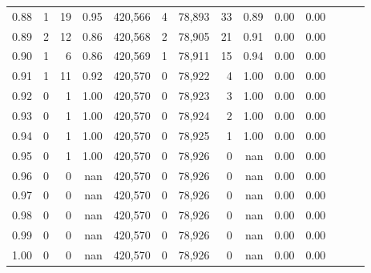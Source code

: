 \begin{tabular}{rrrrrrrrrrrrrr}
0.88 &       1 &     19 &  0.95 &  420,566 &        4 &  78,893 &      33 &  0.89 &  0.00 &      0.00 \\
0.89 &       2 &     12 &  0.86 &  420,568 &        2 &  78,905 &      21 &  0.91 &  0.00 &      0.00 \\
0.90 &       1 &      6 &  0.86 &  420,569 &        1 &  78,911 &      15 &  0.94 &  0.00 &      0.00 \\
0.91 &       1 &     11 &  0.92 &  420,570 &        0 &  78,922 &       4 &  1.00 &  0.00 &      0.00 \\
0.92 &       0 &      1 &  1.00 &  420,570 &        0 &  78,923 &       3 &  1.00 &  0.00 &      0.00 \\
0.93 &       0 &      1 &  1.00 &  420,570 &        0 &  78,924 &       2 &  1.00 &  0.00 &      0.00 \\
0.94 &       0 &      1 &  1.00 &  420,570 &        0 &  78,925 &       1 &  1.00 &  0.00 &      0.00 \\
0.95 &       0 &      1 &  1.00 &  420,570 &        0 &  78,926 &       0 &   nan &  0.00 &      0.00 \\
0.96 &       0 &      0 &   nan &  420,570 &        0 &  78,926 &       0 &   nan &  0.00 &      0.00 \\
0.97 &       0 &      0 &   nan &  420,570 &        0 &  78,926 &       0 &   nan &  0.00 &      0.00 \\
0.98 &       0 &      0 &   nan &  420,570 &        0 &  78,926 &       0 &   nan &  0.00 &      0.00 \\
0.99 &       0 &      0 &   nan &  420,570 &        0 &  78,926 &       0 &   nan &  0.00 &      0.00 \\
1.00 &       0 &      0 &   nan &  420,570 &        0 &  78,926 &       0 &   nan &  0.00 &      0.00 \\
\bottomrule
\end{tabular}
